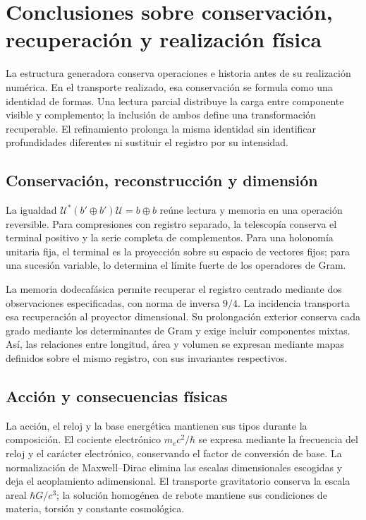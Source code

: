 \chapter{Conclusiones sobre conservación, recuperación y realización física}
\label{x_reciprocidad:nuclear:sintesis}
La estructura generadora conserva operaciones e historia antes de su realización numérica. En el transporte realizado, esa conservación se formula como una identidad de formas. Una lectura parcial distribuye la carga entre componente visible y complemento; la inclusión de ambos define una transformación recuperable. El refinamiento prolonga la misma identidad sin identificar profundidades diferentes ni sustituir el registro por su intensidad.

\section{Conservación, reconstrucción y dimensión}
La igualdad \(\mathcal U^*(b'\oplus b')\mathcal U=b\oplus b\) reúne lectura y memoria en una operación reversible. Para compresiones con registro separado, la telescopía conserva el terminal positivo y la serie completa de complementos. Para una holonomía unitaria fija, el terminal es la proyección sobre su espacio de vectores fijos; para una sucesión variable, lo determina el límite fuerte de los operadores de Gram.

La memoria dodecafásica permite recuperar el registro centrado mediante dos observaciones especificadas, con norma de inversa \(9/4\). La incidencia transporta esa recuperación al proyector dimensional. Su prolongación exterior conserva cada grado mediante los determinantes de Gram y exige incluir componentes mixtas. Así, las relaciones entre longitud, área y volumen se expresan mediante mapas definidos sobre el mismo registro, con sus invariantes respectivos.

\section{Acción y consecuencias físicas}
La acción, el reloj y la base energética mantienen sus tipos durante la composición. El cociente electrónico \(m_ec^2/\hbar\) se expresa mediante la frecuencia del reloj y el carácter electrónico, conservando el factor de conversión de base. La normalización de Maxwell--Dirac elimina las escalas dimensionales escogidas y deja el acoplamiento adimensional. El transporte gravitatorio conserva la escala areal \(\hbar G/c^3\); la solución homogénea de rebote mantiene sus condiciones de materia, torsión y constante cosmológica.

